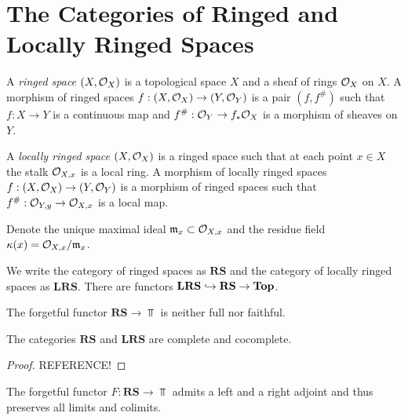 \documentclass[12pt]{article}
\begin{document}
\section{The Categories of Ringed and Locally Ringed Spaces}

\begin{defn}
A \textit{ringed space} $(X, \mathcal{O}_{X})$ is a topological space $X$ and a sheaf of rings $\mathcal{O}_{X}$ on $X$. A morphism of ringed spaces $f : (X, \mathcal{O}_{X}) \to (Y, \mathcal{O}_{Y})$ is a pair $(f, f^\#)$ such that $f : X \to Y$ is a continuous map and $f^\# : \mathcal{O}_{Y} \to f_* \mathcal{O}_{X}$ is a morphism of sheaves on $Y$.
\end{defn}

\begin{defn}
A \textit{locally ringed space} $(X, \mathcal{O}_{X})$ is a ringed space such that at each point $x \in X$ the stalk $\mathcal{O}_{X, x}$ is a local ring. A morphism of locally ringed spaces $f : (X, \mathcal{O}_{X}) \to (Y, \mathcal{O}_{Y})$ is a morphism of ringed spaces such that $f^\# : \mathcal{O}_{Y, y} \to \mathcal{O}_{X, x}$ is a local map.
\end{defn}

\begin{rmk}
Denote the unique maximal ideal $\mathfrak{m}_x \subset \mathcal{O}_{X, x}$ and the residue field $\kappa(x) = \mathcal{O}_{X, x} / \mathfrak{m}_x$.
\end{rmk}

\newcommand{\RS}{\mathbf{RS}}
\newcommand{\LRS}{\mathbf{LRS}}

\begin{defn}
We write the category of ringed spaces as $\RS$ and the category of locally ringed spaces as $\LRS$. There are functors $\LRS \embed \RS \to \Top$.
\end{defn}

\begin{rmk}
The forgetful functor $\RS \to \Top$ is neither full nor faithful.
\end{rmk}

\begin{prop}
The categories $\RS$ and $\LRS$ are complete and cocomplete.
\end{prop}

\begin{proof}
REFERENCE!
\end{proof}

\begin{prop}
The forgetful functor $F : \RS \to \Top$ admits a left and a right adjoint and thus preserves all limits and colimits.
\end{prop}
\end{document}
